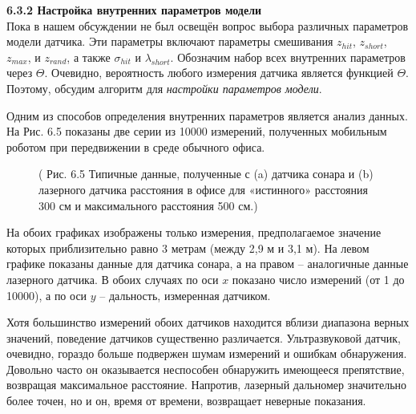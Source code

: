 \documentclass[10pt,a4paper]{article}
\begin{document}
\textbf{6.3.2 Настройка внутренних параметров модели}\\

Пока в нашем обсуждении не был освещён вопрос выбора различных параметров модели датчика. Эти параметры включают параметры смешивания $z_{hit}$, $z_{short}$, $z_{max}$, и $z_{rand}$, а также $\sigma_{hit}$ и $\lambda_{short}$. Обозначим набор всех внутренних параметров через $\varTheta$.
Очевидно, вероятность любого измерения датчика является функцией $\varTheta$. Поэтому, обсудим алгоритм для \textit{настройки параметров модели}.

Одним из способов определения внутренних параметров является анализ данных. На Рис. 6.5 показаны две серии из 10000 измерений, полученных мобильным роботом при передвижении в среде обычного офиса. 

\begin{figure}[H]
	\caption{ ( Рис. 6.5 Типичные данные, полученные с (a) датчика сонара и (b) лазерного датчика расстояния в офисе для «истинного» расстояния 300 см и максимального расстояния 500 см.)}
	\label{fig:65orig}
\end{figure}

На обоих графиках изображены только измерения, предполагаемое значение которых приблизительно  равно 3 метрам (между 2,9 м и 3,1 м). На левом графике показаны данные для датчика сонара, а на правом – аналогичные данные лазерного датчика. В обоих случаях по оси $x$ показано число измерений (от 1 до 10000), а по оси $y$ – дальность, измеренная датчиком. 

Хотя большинство измерений обоих датчиков находится вблизи диапазона верных значений, поведение датчиков существенно различается. Ультразвуковой датчик, очевидно, гораздо больше подвержен шумам измерений и ошибкам обнаружения. Довольно часто он оказывается неспособен обнаружить имеющееся препятствие, возвращая максимальное расстояние. Напротив, лазерный дальномер значительно более точен, но и он, время от времени, возвращает неверные показания. 
\end{document}
